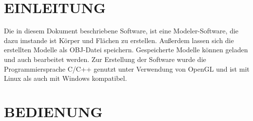 \newcommand\tab[1][1cm]{\hspace*{#1}}
\newpage
	\section{\Large EINLEITUNG}
	Die in diesem Dokument beschriebene Software, ist eine Modeler-Software, die dazu imstande ist Körper und Flächen zu erstellen. Außerdem lassen sich die erstellten Modelle als OBJ-Datei speichern. Gespeicherte Modelle können geladen und auch bearbeitet werden.\newline
Zur Erstellung der Software wurde die Programmiersprache C/C++ genutzt unter Verwendung von OpenGL und ist mit Linux als auch mit Windows kompatibel.
	
	
	\section{\Large BEDIENUNG}
